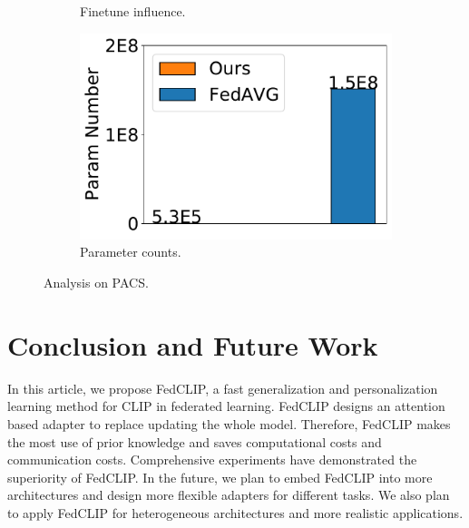 \documentclass[11pt]{article}
\newcommand{\entity}{\mathcal{E}}
\newcommand{\relation}{\mathcal{R}}
\newcommand{\lang}{\mathcal{L}}
\newcommand{\model}{\mathcal{M}}
\newcommand{\method}{FedCLIP\xspace}
\begin{document}
\begin{figure}[t!]
\begin{subfigure}[b]{0.24\textwidth}
		\caption{Finetune influence.}
		\label{fig:anly3}
	\end{subfigure}
 	\begin{subfigure}[b]{0.24\textwidth}
		\centering
		\includegraphics[width=\textwidth]{fig/paramcount.pdf}
		\caption{Parameter counts.}
		\label{fig:anly4}
	\end{subfigure}
	\caption{Analysis on PACS. }
	\label{fig:analysis}
\end{figure}



\section{Conclusion and Future Work}
\label{sec:concl}
In this article, we propose \method, a fast generalization and personalization learning method for CLIP in federated learning.
\method designs an attention based adapter to replace updating the whole model.
Therefore, \method makes the most use of prior knowledge and saves computational costs and communication costs.
Comprehensive experiments have demonstrated the superiority of \method.
In the future, we plan to embed \method into more architectures and design more flexible adapters for different tasks.
We also plan to apply \method for heterogeneous architectures and more realistic applications.


\end{document}
